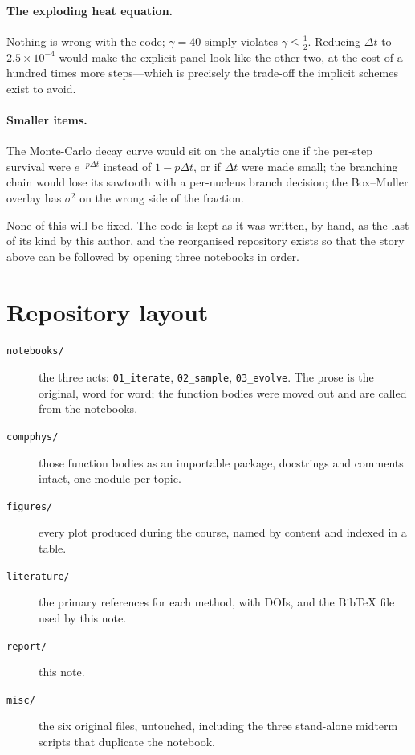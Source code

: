 \documentclass[aps,pra,twocolumn,superscriptaddress,floatfix,nofootinbib]{revtex4-2}
\begin{document}
\paragraph{The exploding heat equation.} Nothing is wrong with the code; $\gamma=40$ simply violates $\gamma\le\tfrac12$. Reducing $\Delta t$ to $2.5\times10^{-4}$ would make the explicit panel look like the other two, at the cost of a hundred times more steps---which is precisely the trade-off the implicit schemes exist to avoid.

\paragraph{Smaller items.} The Monte-Carlo decay curve would sit on the analytic one if the per-step survival were $e^{-p\Delta t}$ instead of $1-p\Delta t$, or if $\Delta t$ were made small; the branching chain would lose its sawtooth with a per-nucleus branch decision; the Box--Muller overlay has $\sigma^2$ on the wrong side of the fraction.

None of this will be fixed. The code is kept as it was written, by hand, as the last of its kind by this author, and the reorganised repository exists so that the story above can be followed by opening three notebooks in order.

\appendix

\section{Repository layout}
\label{app:repo}

\begin{description}
\item[\texttt{notebooks/}] the three acts: \texttt{01\_iterate}, \texttt{02\_sample}, \texttt{03\_evolve}. The prose is the original, word for word; the function bodies were moved out and are called from the notebooks.
\item[\texttt{compphys/}] those function bodies as an importable package, docstrings and comments intact, one module per topic.
\item[\texttt{figures/}] every plot produced during the course, named by content and indexed in a table.
\item[\texttt{literature/}] the primary references for each method, with DOIs, and the BibTeX file used by this note.
\item[\texttt{report/}] this note.
\item[\texttt{misc/}] the six original files, untouched, including the three stand-alone midterm scripts that duplicate the notebook.
\end{description}


\end{document}
